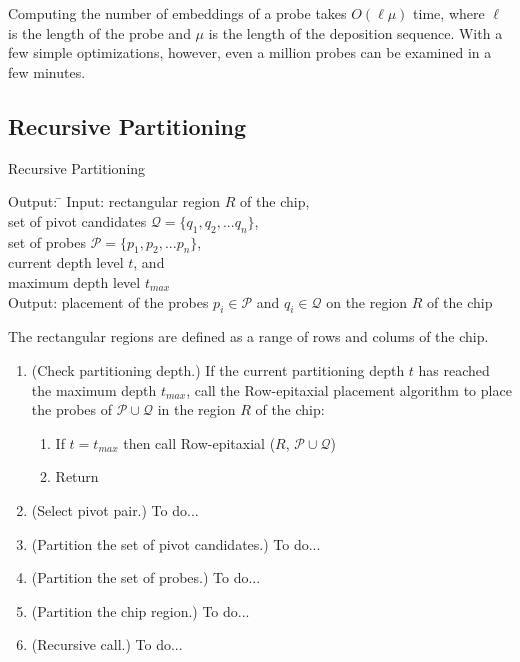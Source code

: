 \documentclass{llncs}
\begin{document}
Computing the number of embeddings of a probe takes $O(\ell \mu)$ time, where $\ell$ is the length
of the probe and $\mu$ is the length of the deposition sequence. With a few simple optimizations,
however, even a million probes can be examined in a few minutes.

\subsection{Recursive Partitioning}

\begin{algorithm}
\caption{Recursive Partitioning}
\label{alg:recursivepart}
\begin{minipage}{4.8in}

\begin{tabbing}
Output: \=									\kill
Input:  \> rectangular region $R$ of the chip,					\\
        \> set of pivot candidates $\mathcal{Q} = \{q_{1}, q_{2}, ... q_{n}\}$, \\
        \> set of probes $\mathcal{P} = \{p_{1}, p_{2}, ... p_{n}\}$,		\\
        \> current depth level $t$, and						\\
        \> maximum depth level $t_{max}$					\\
Output: \> placement of the probes $p_i \in \mathcal{P}$ and
           $q_i \in \mathcal{Q}$ on the region $R$ of the chip
\end{tabbing}

The rectangular regions are defined as a range of rows and colums of the chip.

\begin{enumerate}
\item (Check partitioning depth.) If the current partitioning depth $t$ has reached
the maximum depth $t_{max}$, call the Row-epitaxial placement algorithm to place the
probes of $\mathcal{P} \cup \mathcal{Q}$ in the region $R$ of the chip:
  \begin{enumerate}
  \item If $t = t_{max}$ then call Row-epitaxial ($R$, $\mathcal{P} \cup \mathcal{Q}$)
  \item Return
  \end{enumerate}
\item (Select pivot pair.) To do...
\item (Partition the set of pivot candidates.) To do...
\item (Partition the set of probes.) To do...
\item (Partition the chip region.) To do...
\item (Recursive call.) To do...
\end{enumerate}

\end{minipage}
\end{algorithm}
\end{document}
